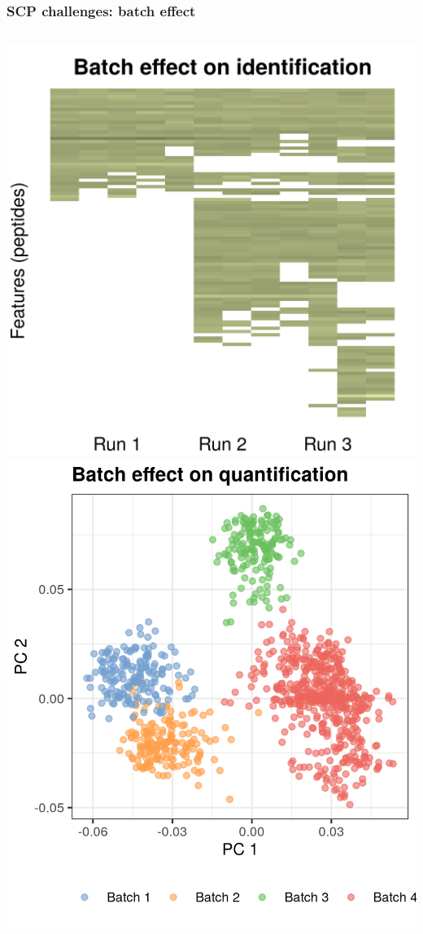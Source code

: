 \documentclass{beamer}
\begin{document}
\begin{frame}
  \frametitle{SCP challenges: batch effect}
  
  \begin{columns}
    \includegraphics[width=\linewidth]{figs/batch_effects.png}
    \vspace{1cm}
    \includegraphics[width=\linewidth]{figs/PCA_batch_effect.png}
  \end{columns}
  
\end{frame}
\end{document}
